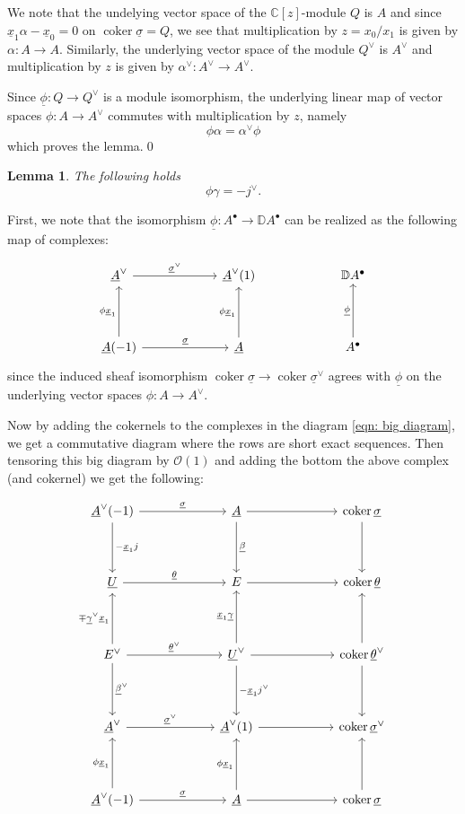 \documentclass{amsart}
\newtheorem{lemma}[theorem]{Lemma}
\theoremstyle{definition}
\newcommand{\CC} {{\mathbb C}}          %
\newcommand{\DD} {{\mathbb D}}
\newcommand{\OO}{\mathcal{O}}
\newcommand{\coker}{\operatorname{coker}}
\newcommand{\UL}[1]{\underline{#1}}
\begin{document}
We note that the undelying vector space of the $\CC [z]$-module $Q$ is
$A$ and since $\UL{x}_{1}\alpha -\UL{x}_{0}=0$ on $\coker
\UL{\sigma}=Q$, we see that multiplication by $z=x_{0}/x_{1}$ is given
by $\alpha :A\to A$. Similarly, the underlying vector space of the
module $Q^{\vee}$ is $A^{\vee}$ and multiplication by $z$ is given by
$\alpha^{\vee}:A^{\vee}\to A^{\vee}$.

Since $\UL{\phi}:Q\to Q^{\vee}$ is a module isomorphism, the
underlying linear map of vector spaces $\phi :A\to A^{\vee}$ commutes
with multiplication by $z$, namely
\[
\phi \alpha =\alpha^{\vee}\phi 
\]
which proves the lemma.\qed 

\begin{lemma}\label{lem: phi.gamma = -jvee}
The following holds
\[
\phi \gamma =-j^{\vee}.
\]
\end{lemma}
\proof
First, we note that the isomorphism $\UL{\phi}:A^{\bullet}\to \DD
A^{\bullet}$ can be realized as the following map of complexes:

\[
\begin{tikzcd}[column sep=6em,row sep=4em]
  \UL{A}^{\vee }
    \arrow[r,"\UL{\sigma}^{\vee}"]
  & \UL{A}^{\vee}(1)
  & \DD A^{\bullet }
  \\
  \UL{A}(-1)
    \arrow[r,"\UL{\sigma  }"]
    \arrow[u,"\phi \UL{x}_{1}"]
  & \UL{A}
    \arrow[u,"\phi \UL{x}_{1}"]
  & A^{\bullet}
    \arrow[u,"\UL{\phi } "]
\end{tikzcd}
\]
since the induced sheaf isomorphism $\coker \UL{\sigma}\to \coker
\UL{\sigma}^{\vee}$ agrees with $\UL{\phi}$ on the underlying vector
spaces $\phi :A\to A^{\vee}$.

Now by adding the cokernels to the complexes in the diagram
\eqref{eqn: big diagram}, we get a commutative diagram where the rows
are short exact sequences. Then tensoring this big diagram by $\OO
(1)$ and adding the bottom the above complex (and cokernel) we get the
following:

\begin{equation*}
\begin{tikzcd}[column sep=6em,row sep=4em]
  \UL{A}^{\vee }(-1)
    \arrow[d,"-\UL{x}_{1}j"]
    \arrow[r,"\UL{\sigma  }"]
  & \UL{A}
    \arrow[d,"\UL{\beta }"]
    \arrow[r]
  & \coker \UL{\sigma }
    \arrow[d]
  \\
  \UL{U}
    \arrow[r,"\UL{\theta }"]
  & E
    \arrow[r]
  & \coker \UL{\theta }
  \\
  E^{\vee}
    \arrow[d,"\UL{\beta}^{\vee}"]
    \arrow[u,"\mp \UL{\gamma}^{\vee}\UL{x}_{1}"]
    \arrow[r,"\UL{\theta }^{\vee}"]
  & \UL{U}^{\vee }
    \arrow[r]
    \arrow[d,"-\UL{x}_{1}j^{\vee}"]
    \arrow[u,"\UL{x}_{1}\UL{\gamma }"]
  & \coker \UL{\theta}^{\vee}
    \arrow[d]
    \arrow[u]
  \\
    \UL{A}^{\vee} 
    \arrow[r,"\UL{\sigma  }^{\vee}"]
  & \UL{A}^{\vee}(1)
    \arrow[r]
  & \coker \UL{\sigma}^{\vee}
  \\
  \UL{A}^{\vee }(-1)
    \arrow[u,"\phi \UL{x}_{1}"]
    \arrow[r,"\UL{\sigma  }"]
  & \UL{A}
    \arrow[u,"\phi \UL{x}_{1}"]
    \arrow[r]
  & \coker \UL{\sigma }
    \arrow[u]    
\end{tikzcd}
\end{equation*}
\end{document}
